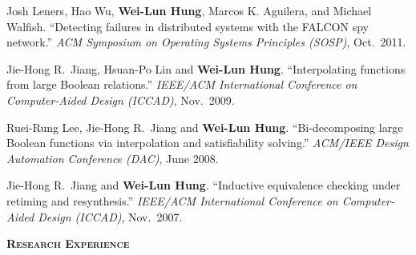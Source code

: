 \documentclass[11pt, letterpaper]{article}
\newcommand{\myscitem}[1]{\vspace{0.5\baselineskip} {\Large \textbf{\textsc{#1}} \reallynopagebreak}}
\newcommand{\myname}[1]{{\bf #1}}
\newenvironment{myenumerate}{
  \begin{list}{[\arabic{enumi}]}{
      \usecounter{enumi}
      \setlength{\itemindent}{0in}
      \setlength{\leftmargin}{0.3in}
      \addtolength{\topsep}{-0.1in}
    }
}{\end{list}}
\begin{document}
\begin{myenumerate}
\item Josh Leners, Hao Wu, \myname{Wei-Lun Hung}, Marcos K. Aguilera, and Michael Walfish.
``Detecting failures in distributed systems with the FALCON spy network.''
{\it ACM Symposium on Operating Systems Principles (SOSP)}, Oct.~2011.
\item Jie-Hong R.~Jiang, Hsuan-Po Lin and  \myname{Wei-Lun Hung}.
  ``Interpolating functions from large Boolean relations.''
  {\it  IEEE/ACM International Conference on Computer-Aided Design (ICCAD)},  Nov.~2009.
\item Ruei-Rung Lee, Jie-Hong R.~Jiang and \myname{Wei-Lun Hung}.
  ``Bi-decomposing large Boolean functions via interpolation and satisfiability solving.''
  {\it ACM/IEEE Design Automation Conference (DAC)}, June 2008. %
\item Jie-Hong R.~Jiang and \myname{Wei-Lun Hung}.
  ``Inductive equivalence checking under retiming and resynthesis.''
  {\it IEEE/ACM International Conference on Computer-Aided Design (ICCAD)},
  Nov.~2007.%
\end{myenumerate}



\myscitem{Research Experience}
\end{document}
